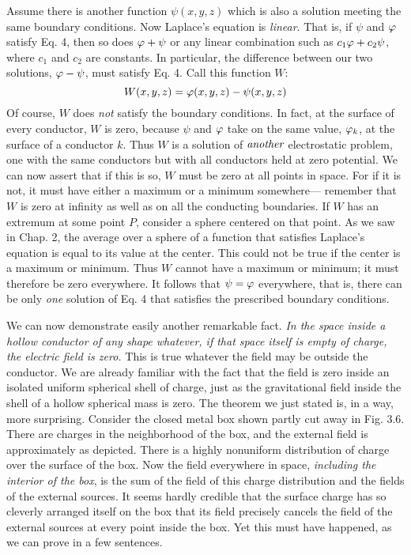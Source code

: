 Assume there is another function $\psi(x,y,z)$ which is also a solution
meeting the same boundary conditions. Now Laplace's equation is
\emph{linear}. That is, if $\psi$ and $\varphi$ satisfy Eq. 4, then so does $\varphi+\psi$ or any
linear combination such as $c_1\varphi+c_2\psi$, where $c_1$ and $c_2$ are constants.
In particular, the difference between our two solutions, $\varphi-\psi$, must
satisfy Eq. 4. Call this function $W$:
\begin{equation}
  W(x,y,z) = \varphi(x,y,z)-\psi(x,y,z)
\end{equation}
Of course, $W$ does \emph{not} satisfy the boundary conditions. In fact, at
the surface of every conductor, $W$ is zero, because $\psi$ and $\varphi$ take on
the same value, $\varphi_k$, at the surface of a conductor $k$. Thus $W$ is a solution
of $\emph{another}$ electrostatic problem, one with the same conductors
but with all conductors held at zero potential. We can now assert
that if this is so, $W$ must be zero at all points in space. For if it is not,
it must have either a maximum or a minimum somewhere---
remember that $W$ is zero at infinity as well as on all the conducting
boundaries. If $W$ has an extremum at some point $P$, consider a
sphere centered on that point. As we saw in Chap. 2, the average
over a sphere of a function that satisfies Laplace's equation is equal
to its value at the center. This could not be true if the center is a
maximum or minimum. Thus $W$ cannot have a maximum or minimum;
it must therefore be zero everywhere. It follows that $\psi=\varphi$
everywhere, that is, there can be only \emph{one} solution of Eq. 4 that
satisfies the prescribed boundary conditions.

We can now demonstrate easily another remarkable fact. \emph{In the
space inside a hollow conductor of any shape whatever, if that space
itself is empty of charge, the electric field is zero.} This is true whatever
the field may be outside the conductor. We are already familiar
with the fact that the field is zero inside an isolated uniform spherical
shell of charge, just as the gravitational field inside the shell of a
hollow spherical mass is zero. The theorem we just stated is, in a
way, more surprising. Consider the closed metal box shown partly
cut away in Fig. 3.6. There are charges in the neighborhood of the
box, and the external field is approximately as depicted. There is a
highly nonuniform distribution of charge over the surface of the box.
Now the field everywhere in space, \emph{including the interior of the box},
is the sum of the field of this charge distribution and the fields of the
external sources. It seems hardly credible that the surface charge
has so cleverly arranged itself on the box that its field precisely cancels
the field of the external sources at every point inside the box. Yet
this must have happened, as we can prove in a few sentences.


